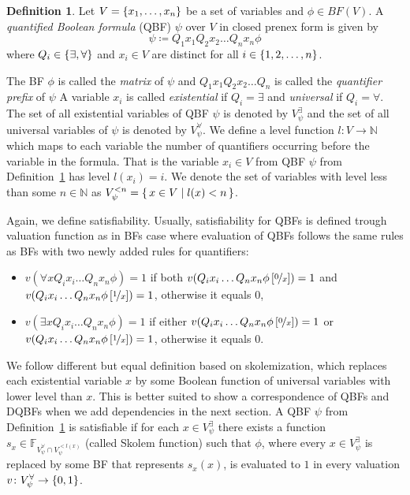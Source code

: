 \documentclass[
  digital, %
  twoside, %
  table,   %
  nolof,     %
  nolot,     %
]{fithesis3}
\let\setbuilder\set
\newcommand{\simpleset}[1]{\{{#1}\}}
\renewcommand{\set}[1]{\normalexpandarg\IfSubStr{#1}{|}{\setbuilder{#1}}{\simpleset{#1}}}
\theoremstyle{definition}
\newtheorem{definition}{Definition}
\theoremstyle{remark}
\newcommand{\substitute}[2]{\left[ \nicefrac{#2}{#1} \right]}
\newcommand{\BF}[1]{BF(#1)}
\newcommand{\BFuncs}[1]{\mathbb{F}_{#1}}
\newcommand{\evars}[1]{V_{#1}^{\exists}}
\newcommand{\uvars}[1]{V_{#1}^{\forall}}
\begin{document}
\begin{definition}
Let $V = \set{x_1,\dots,x_n}$ be a set of variables and $\phi \in \BF{V}$. A \emph{quantified Boolean formula} (QBF) $\psi$ over $V$ in closed prenex form is given by
\[\psi \coloneqq Q_1 x_1 Q_2 x_2 \dots Q_n x_n \phi\]
where $Q_i \in \set{{\exists}, {\forall}}$ and $x_i \in V$ are distinct for all $i \in \set{1,2,\dots,n}$.
\label{def:QBF}
\end{definition}

The BF $\phi$ is called the \emph{matrix} of $\psi$ and $Q_1 x_1 Q_2 x_2 \dots Q_n$ is called the \emph{quantifier prefix} of $\psi$ A variable $x_i$ is called \emph{existential} if $Q_i = \exists$ and \emph{universal} if $Q_i = \forall$. The set of all existential variables of QBF $\psi$ is denoted by $\evars{\psi}$ and the set of all universal variables of $\psi$ is denoted by $\uvars{\psi}$. We define a level function $l\colon V \to \mathbb{N}$ which maps to each variable the number of quantifiers occurring before the variable in the formula. That is the variable $x_i \in V$ from QBF $\psi$ from Definition~\ref{def:QBF} has level $l(x_i) = i$. We denote the set of variables with level less than some $n \in \mathbb{N}$ as $V_{\psi}^{<n} = \set{x \in V | l(x) < n}$.

Again, we define satisfiability. Usually, satisfiability for QBFs is defined trough valuation function as in BFs case where evaluation of QBFs follows the same rules as BFs with two newly added rules for quantifiers:
\begin{itemize}
    \item $v(\forall x Q_i x_i \dots Q_n x_n \phi) = 1$ if both $v(Q_i x_i \dots Q_n x_n \phi\substitute{x}{0}) = 1$ and $v(Q_i x_i \dots Q_n x_n \phi\substitute{x}{1}) = 1$, otherwise it equals $0$,
    \item $v(\exists x Q_i x_i \dots Q_n x_n \phi) = 1$ if either $v(Q_i x_i \dots Q_n x_n \phi\substitute{x}{0}) = 1$ or $v(Q_i x_i \dots Q_n x_n \phi\substitute{x}{1}) = 1$, otherwise it equals $0$.
\end{itemize}
We follow different but equal definition based on skolemization, which replaces each existential variable $x$ by some Boolean function of universal variables with lower level than $x$. This is better suited to show a correspondence of QBFs and DQBFs when we add dependencies in the next section. A QBF $\psi$ from Definition~\ref{def:QBF} is satisfiable if for each $x \in V_{\psi}^{\exists}$ there exists a function $s_{x} \in \BFuncs{\uvars{\psi}\cap V_{\psi}^{<l(x)}}$ (called Skolem function) such that $\phi$, where every $x \in \evars{\psi}$ is replaced by some BF that represents $s_x(x)$, is evaluated to $1$ in every valuation $v\colon \uvars{\psi} \to \set{0,1}$.
\end{document}
